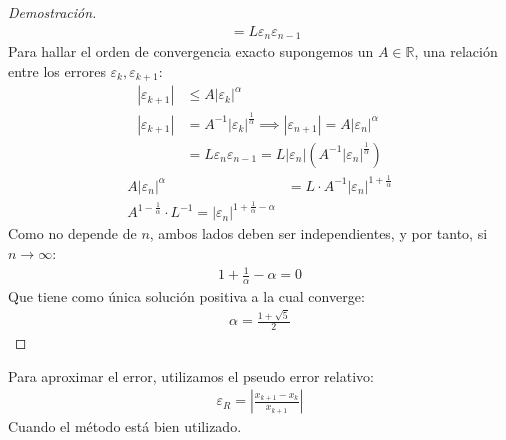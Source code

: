 \documentclass{article}
\begin{document}
\begin{proof}[Demostración]
\begin{equation}
\begin{split}
            &= L \varepsilon _{n} \varepsilon _{n-1}
        \end{split}
    \end{equation}
    Para hallar el orden de convergencia exacto supongemos un $A \in \mathbb{R}$, una relación
    entre los errores $\varepsilon _{k}, \varepsilon _{k+1}$:
    \begin{equation}
        \begin{split}
            |\varepsilon _{k+1}| &\leq A |\varepsilon _{k}|^{\alpha }\\
            |\varepsilon _{k+1}| &= A^{-1}|\varepsilon _{k}|^{\frac{1}{\alpha }} \implies 
            |\varepsilon _{n+1}| = A |\varepsilon _{n}|^{\alpha }\\
            &= L \varepsilon _{n} \varepsilon _{n-1} = L |\varepsilon _{n}|
            (A^{-1}|\varepsilon _{n}|^{\frac{1}{\alpha }})
        \end{split}
    \end{equation}
    \begin{equation}
        \begin{split}
            A|\varepsilon _{n}|^{\alpha } &= L\cdot A^{-1}|\varepsilon _{n}|^{1+\frac{1}{\alpha }}\\
            A^{1-\frac{1}{\alpha }}\cdot L^{-1}=|\varepsilon _{n}|^{1+\frac{1}{\alpha }-\alpha }
        \end{split}
    \end{equation}
    Como no depende de $n$, ambos lados deben ser independientes, y por tanto, si $n \to  \infty$:
    \begin{equation}
        \begin{split}
            1+\frac{1}{\alpha }-\alpha =0
        \end{split}
    \end{equation}
    Que tiene como única solución positiva a la cual converge:
    \begin{equation}
        \begin{split}
            \boxed{\alpha = \frac{1+\sqrt{5}}{2}}
        \end{split}
    \end{equation}
\end{proof}
Para aproximar el error, utilizamos el pseudo error relativo:
\begin{equation}
    \begin{split}
        \varepsilon _{R} = |\frac{x_{k+1}-x_{k}}{x_{k+1}}|
    \end{split}
\end{equation}
Cuando el método está bien utilizado.
\end{document}

